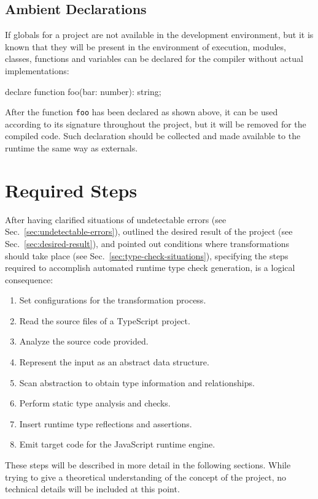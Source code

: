 \subsection{Ambient Declarations}

If globals for a project are not available in the development environment, but it is known that they will be present in the environment of execution, modules, classes, functions and variables can be declared for the compiler without actual implementations:
\begin{JsCode}[numbers=none]
declare function foo(bar: number): string;
\end{JsCode}
After the function \texttt{foo} has been declared as shown above, it can be used according to its signature throughout the project, but it will be removed for the compiled code. Such declaration should be collected and made available to the runtime the same way as externals.

\section{Required Steps}
\label{sec:required-steps}

After having clarified situations of undetectable errors (see Sec.~\ref{sec:undetectable-errors}), outlined the desired result of the project (see Sec.~\ref{sec:desired-result}), and pointed out conditions where transformations should take place (see Sec.~\ref{sec:type-check-situations}), specifying the steps required to accomplish automated runtime type check generation, is a logical consequence:
\begin{enumerate}
  \item Set configurations for the transformation process.
  \item Read the source files of a TypeScript project.
  \item Analyze the source code provided.
  \item Represent the input as an abstract data structure.
  \item Scan abstraction to obtain type information and relationships.
  \item Perform static type analysis and checks.
  \item Insert runtime type reflections and assertions.
  \item Emit target code for the JavaScript runtime engine.
\end{enumerate}
These steps will be described in more detail in the following sections. While trying to give a theoretical understanding of the concept of the project, no technical details will be included at this point.


